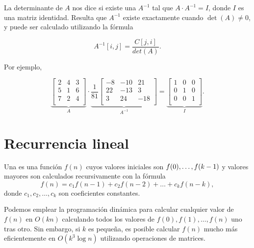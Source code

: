 
La determinante de $A$ nos dice si existe una  $A^{-1}$
tal que $A \cdot A^{-1} = I$, donde $I$ es una matriz identidad. Resulta que
$A^{-1}$ existe exactamente cuando $\det(A) \neq 0$, y puede ser calculado
utilizando la fórmula

\[A^{-1}[i,j] = \frac{C[j,i]}{det(A)}.\]

Por ejemplo,

\[
    \underbrace{
        \begin{bmatrix}
            2 & 4 & 3 \\
            5 & 1 & 6 \\
            7 & 2 & 4 \\
        \end{bmatrix}
    }_{A}
    \cdot
    \underbrace{
        \frac{1}{81}
        \begin{bmatrix}
            -8 & -10 & 21  \\
            22 & -13 & 3   \\
            3  & 24  & -18 \\
        \end{bmatrix}
    }_{A^{-1}}
    =
    \underbrace{
        \begin{bmatrix}
            1 & 0 & 0 \\
            0 & 1 & 0 \\
            0 & 0 & 1 \\
        \end{bmatrix}
    }_{I}.
\]

\section{Recurrencia lineal}


Una  es una función $f(n)$ cuyos valores iniciales son
$f(0),\ldots,\\f(k-1)$ y valores mayores son calculados recursivamente con la
fórmula \[f(n) = c_1 f(n-1) + c_2 f(n-2) + \ldots + c_k f (n-k),\]
donde $c_1,c_2,\ldots,c_k$ son coeficientes constantes.

Podemos emplear la programación dinámica para calcular cualquier valor de
$f(n)$ en $O(kn)$ calculando todos los valores de $f(0),f(1),\ldots,f(n)$
uno tras otro. Sin embargo, si $k$ es pequeña, es posible calcular $f(n)$
mucho más eficientemente en $O(k^3 \log n)$ utilizando operaciones de matrices.

